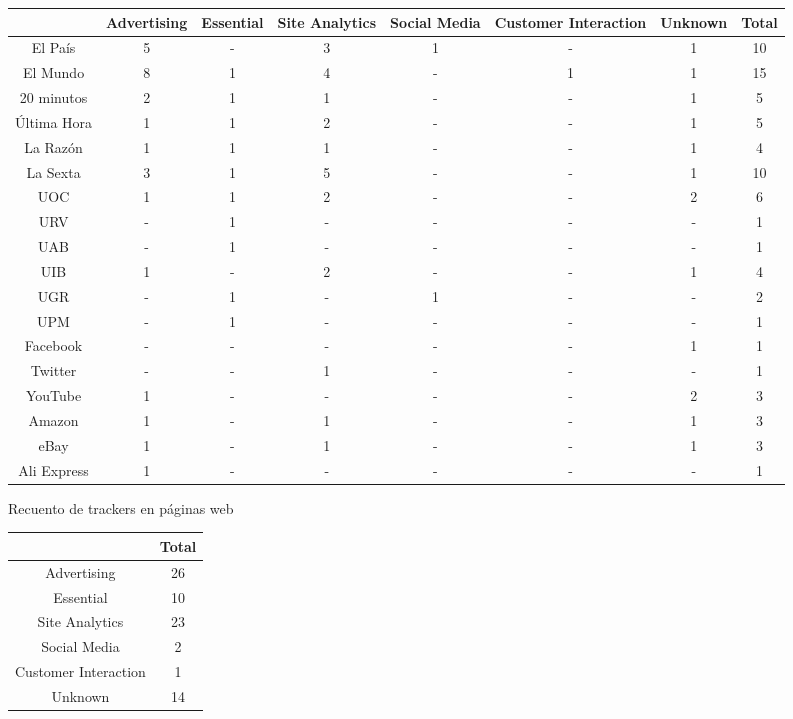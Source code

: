 \documentclass[10pt,a4paper]{article}
\begin{document}
	\hskip-3.5cm
    \begin{tabular}{| c | c | c | c | c | c | c | c |}
    \hline
     	& Advertising & Essential & Site Analytics & Social Media & Customer Interaction & Unknown & Total\\ \hline
    El País & 5 & - &  3 & 1 & - & 1 & 10 \\ \hline
    El Mundo & 8 & 1 & 4 & - & 1 & 1 & 15 \\ \hline
    20 minutos & 2 & 1 & 1 & - & - & 1 & 5 \\ \hline
    Última Hora & 1 & 1 & 2 & - & - & 1 & 5 \\ \hline
    La Razón & 1 & 1 & 1 & - & - & 1 & 4 \\ \hline
    La Sexta & 3 & 1 & 5 & - & - & 1 & 10 \\ \hline
    UOC & 1 & 1 & 2 & - & - & 2 & 6 \\ \hline
    URV & - & 1 & - & - & - & - & 1 \\ \hline
    UAB & - & 1 & - & - & - & - & 1 \\ \hline
    UIB & 1 & - & 2 & - & - & 1 & 4 \\ \hline
    UGR & - & 1 & - & 1 & - & - & 2 \\ \hline
    UPM & - & 1 & - & - & - & - & 1 \\ \hline
    Facebook & - & - & - & - & - & 1 & 1 \\ \hline
    Twitter & - & - & 1 & - & - & - & 1  \\ \hline
    YouTube & 1 & - & - & - & - & 2 & 3 \\ \hline
    Amazon & 1 & - & 1 & - & - & 1 & 3  \\ \hline
    eBay & 1 & - & 1 & - & - & 1 & 3 \\ \hline
    Ali Express & 1 & - & - & - & - & - & 1 \\ 
    \hline
    \end{tabular}
    \begin{center}
	Recuento de trackers en páginas web
    \end{center}
    
    \begin{center}
		\begin{tabular}{| c | c |}
	    \hline
     		& Total \\ \hline
	    Advertising & 26 \\ \hline
    	Essential & 10 \\ \hline
	    Site Analytics & 23 \\ \hline
    	Social Media & 2 \\ \hline
    	Customer Interaction & 1 \\ \hline
    	Unknown & 14 \\
    	\hline
	    \end{tabular}    
    \end{center}
    
\end{document}
